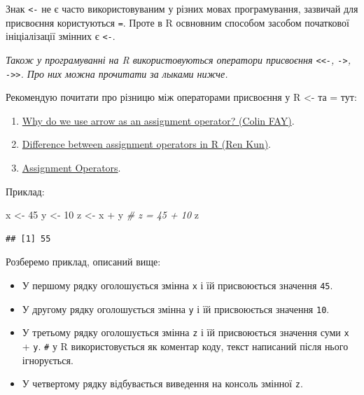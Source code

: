 \documentclass[
]{book}
\newenvironment{Shaded}{\begin{snugshade}}{\end{snugshade}}
\newcommand{\CommentTok}[1]{\textcolor[rgb]{0.56,0.35,0.01}{\textit{#1}}}
\newcommand{\DecValTok}[1]{\textcolor[rgb]{0.00,0.00,0.81}{#1}}
\newcommand{\NormalTok}[1]{#1}
\newcommand{\OtherTok}[1]{\textcolor[rgb]{0.56,0.35,0.01}{#1}}
\newcommand{\SpecialCharTok}[1]{\textcolor[rgb]{0.00,0.00,0.00}{#1}}
\providecommand{\tightlist}{%
  \setlength{\itemsep}{0pt}\setlength{\parskip}{0pt}}
\begin{document}
Знак \texttt{\textless{}-} не є часто використовуваним у різних мовах програмування, зазвичай для присвоєння користуються \texttt{=}. Проте в R освновним способом засобом початкової ініціалізації змінних є \texttt{\textless{}-}.

\emph{Також у програмуванні на R використовуються оператори присвоєння \texttt{\textless{}\textless{}-}, \texttt{-\textgreater{}}, \texttt{-\textgreater{}\textgreater{}}. Про них можна прочитати за лыками нижче.}

Рекомендую почитати про різницю між операторами присвоєння у R \textless- та = тут:

\begin{enumerate}
\def\labelenumi{\arabic{enumi}.}
\tightlist
\item
  \href{https://colinfay.me/r-assignment/}{Why do we use arrow as an assignment operator? (Colin FAY)}.
\item
  \href{https://renkun.me/2014/01/28/difference-between-assignment-operators-in-r/}{Difference between assignment operators in R (Ren Kun)}.
\item
  \href{https://stat.ethz.ch/R-manual/R-devel/library/base/html/assignOps.html}{Assignment Operators}.
\end{enumerate}

Приклад:

\begin{Shaded}
\begin{Highlighting}[]
\NormalTok{x }\OtherTok{\textless{}{-}} \DecValTok{45}
\NormalTok{y }\OtherTok{\textless{}{-}} \DecValTok{10}
\NormalTok{z }\OtherTok{\textless{}{-}}\NormalTok{ x }\SpecialCharTok{+}\NormalTok{ y }\CommentTok{\# z = 45 + 10}
\NormalTok{z}
\end{Highlighting}
\end{Shaded}

\begin{verbatim}
## [1] 55
\end{verbatim}

Розберемо приклад, описаний вище:

\begin{itemize}
\tightlist
\item
  У першому рядку оголошується змінна \texttt{x} і їй присвоюється значення \texttt{45}.
\item
  У другому рядку оголошується змінна \texttt{y} і їй присвоюється значення \texttt{10}.
\item
  У третьому рядку оголошується змінна \texttt{z} і їй присвоюється значення суми \texttt{x} + \texttt{y}.
  \texttt{\#} у R використовується як коментар коду, текст написаний після нього ігнорується.
\item
  У четвертому рядку відбувається виведення на консоль змінної \texttt{z}.
\end{itemize}
\end{document}
